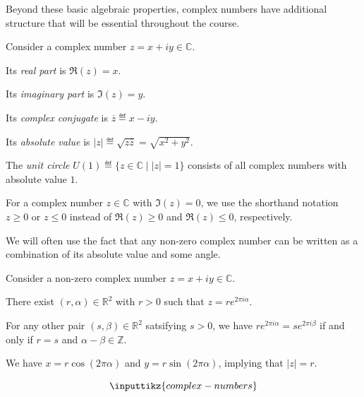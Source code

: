 \documentclass[a4paper,oneside, 12pt]{amsart}
\begin{document}
Beyond these basic algebraic properties, complex numbers have additional structure that will be essential throughout the course.

\begin{definition}\label{def:some-props-of-complex-numbers}
  Consider a complex number \( z = x + iy \in \mathbb{C} \).
  \begin{thmlist}
    \item Its \emph{real part} is \(\Re(z) = x\).
    \item Its \emph{imaginary part} is \(\Im(z) = y\).
    \item Its \emph{complex conjugate} is \(\overline{z}\eqdef x-iy\).
    \item Its \emph{absolute value} is \(|z| \eqdef \sqrt{z\overline{z}} = \sqrt{x^{2}+y^{2}}\).
  \end{thmlist}

  The \emph{unit circle} \(U(1)\eqdef\{z \in \mathbb{C} \mid |z| = 1\}\) consists of all complex numbers with absolute value \(1\).
\end{definition}

\begin{notation}
  For a complex number \(z \in \mathbb{C}\) with \(\Im(z) = 0\), we use the shorthand notation \(z \geq 0\) or \(z\leq 0\) instead of \(\Re(z) \geq 0\) and \(\Re(z) \leq 0\), respectively.
\end{notation}


We will often use the fact that any non-zero complex number can be written as a combination of its absolute value and some angle.

\begin{lemma}\label{lem:polar-form-uniqueness}
  Consider a non-zero complex number \(z= x +iy \in \mathbb{C}\).
  \begin{thmlist}
    \item There exist \((r, \alpha) \in \mathbb{R}^{2}\) with \(r>0\) such that
    \(z = re^{2\pi i \alpha}\).
    \item For any other pair \((s, \beta)\in \mathbb{R}^{2}\) satsifying \(s>0\), we have \(re^{2\pi i \alpha} = s e^{2 \pi i \beta}\) if and only if \(r=s\) and \(\alpha-\beta \in \mathbb{Z}\).
    \item We have \(x = r\cos(2 \pi \alpha)\) and \(y = r\sin(2 \pi \alpha)\), implying that \(|z| = r\).
  \end{thmlist}
\end{lemma}

\begin{equation*}
  \inputtikz{complex-numbers}
\end{equation*}
\end{document}
